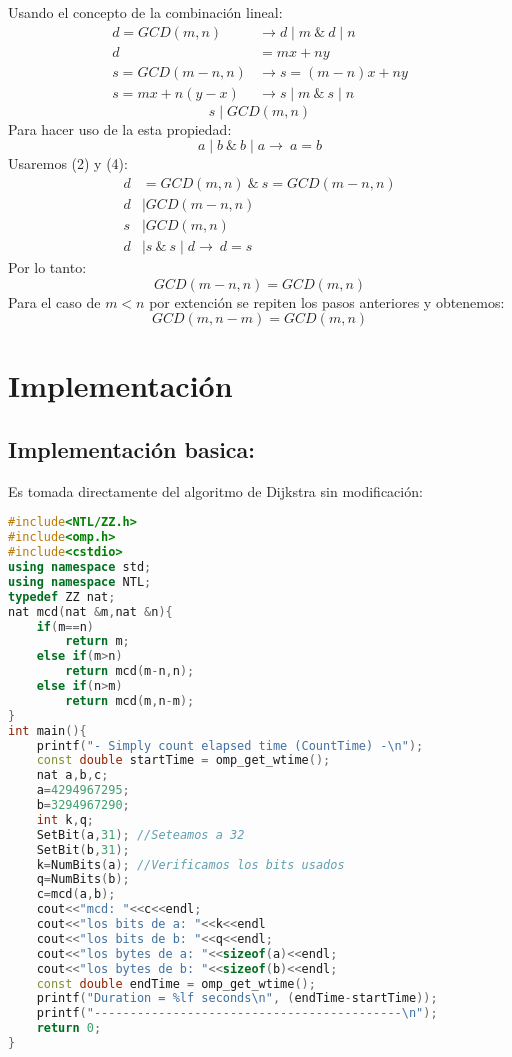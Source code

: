 Usando el concepto de la combinaci\'on lineal:
\begin{equation*}
 \begin{align}
  d=GCD(m,n) &\rightarrow d\mid m \:\&\: d\mid n \\
  d&=mx+ny\\
  s=GCD(m-n,n) &\rightarrow s=(m-n)x+ny \\
  s=mx+n(y-x) &\rightarrow s\mid m \:\&\: s\mid n 
 \end{align}
\end{equation*}
\begin{equation}
 s\mid GCD(m,n)
\end{equation}
Para hacer uso de la esta propiedad: 
\begin{equation*}
 a\mid b \:\&\:b\mid a\rightarrow\:a=b
\end{equation*}
Usaremos (2) y (4):
\begin{equation*}
 \begin{align}
  d&=GCD(m,n) \:\&\: s=GCD(m-n,n)\\
  d&\mid GCD(m-n,n)\\
  s&\mid GCD(m,n) \\
  d&\mid s \:\&\:s\mid d\rightarrow\:d=s 
 \end{align}
\end{equation*}
Por lo tanto:
\begin{equation}
 GCD(m-n,n)=GCD(m,n)
\end{equation}
Para el caso de $m<n$ por extenci\'on se repiten los pasos anteriores y obtenemos:
\begin{equation}
 GCD(m,n-m)=GCD(m,n)
\end{equation}

\section{Implementaci\'on}
\subsection{Implementaci\'on basica:}
Es tomada directamente del algoritmo de Dijkstra sin modificaci\'on:
\begin{lstlisting}[language=C++]
#include<NTL/ZZ.h>
#include<omp.h>
#include<cstdio>
using namespace std;
using namespace NTL;
typedef ZZ nat;
nat mcd(nat &m,nat &n){
    if(m==n)
        return m;
    else if(m>n)
        return mcd(m-n,n);
    else if(n>m)
        return mcd(m,n-m);
}
int main(){
    printf("- Simply count elapsed time (CountTime) -\n");
    const double startTime = omp_get_wtime();
    nat a,b,c;
    a=4294967295;
    b=3294967290;
    int k,q;
    SetBit(a,31); //Seteamos a 32
    SetBit(b,31);
    k=NumBits(a); //Verificamos los bits usados
    q=NumBits(b);
    c=mcd(a,b);
    cout<<"mcd: "<<c<<endl;
    cout<<"los bits de a: "<<k<<endl
    cout<<"los bits de b: "<<q<<endl;
    cout<<"los bytes de a: "<<sizeof(a)<<endl;
    cout<<"los bytes de b: "<<sizeof(b)<<endl;
    const double endTime = omp_get_wtime();
    printf("Duration = %lf seconds\n", (endTime-startTime));
    printf("-------------------------------------------\n");
    return 0;
}
\end{lstlisting}
